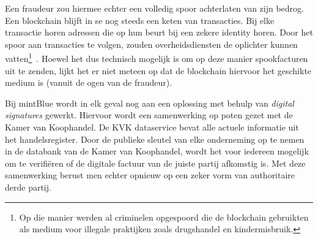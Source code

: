 Een fraudeur zou hiermee echter een volledig spoor achterlaten van zijn bedrog. Een blockchain blijft in se nog steeds een keten van transacties. Bij elke transactie horen adressen die op hun beurt bij een zekere identity horen. Door het spoor aan transacties te volgen, zouden overheidsdiensten de oplichter kunnen vatten\footnote{Op die manier werden al criminelen opgespoord die de blockchain gebruikten als medium voor illegale praktijken zoals drugshandel en kindermisbruik.}~\autocite{Bohannon2016}. Hoewel het dus technisch mogelijk is om op deze manier spookfacturen uit te zenden, lijkt het er niet meteen op dat de blockchain hiervoor het geschikte medium is (vanuit de ogen van de fraudeur).

Bij mintBlue wordt in elk geval nog aan een oplossing met behulp van \textit{digital signatures} gewerkt. Hiervoor wordt een samenwerking op poten gezet met de Kamer van Koophandel. De KVK dataservice bevat alle actuele informatie uit het handelsregister. Door de publieke sleutel van elke onderneming op te nemen in de databank van de Kamer van Koophandel, wordt het voor iedereen mogelijk om te verifiëren of de digitale factuur van de juiste partij afkomstig is. Met deze samenwerking berust men echter opnieuw op een zeker vorm van authoritaire derde partij. 




